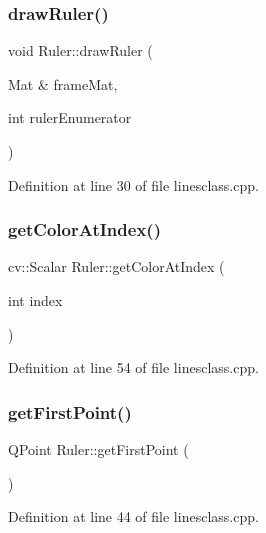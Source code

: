 \subsubsection{\texorpdfstring{drawRuler()}{drawRuler()}}
{\footnotesize\ttfamily void Ruler\+::draw\+Ruler (\begin{DoxyParamCaption}\item[{Mat \&}]{frame\+Mat,  }\item[{int}]{ruler\+Enumerator }\end{DoxyParamCaption})}



Definition at line 30 of file linesclass.\+cpp.

\mbox{\label{class_ruler_ae7e524a583b89c5905d1aee2d6ecb85d}} 
\subsubsection{\texorpdfstring{getColorAtIndex()}{getColorAtIndex()}}
{\footnotesize\ttfamily cv\+::\+Scalar Ruler\+::get\+Color\+At\+Index (\begin{DoxyParamCaption}\item[{int}]{index }\end{DoxyParamCaption})}



Definition at line 54 of file linesclass.\+cpp.

\mbox{\label{class_ruler_acd500bb44e0a7f79e881ae15e0a6a03a}} 
\subsubsection{\texorpdfstring{getFirstPoint()}{getFirstPoint()}}
{\footnotesize\ttfamily Q\+Point Ruler\+::get\+First\+Point (\begin{DoxyParamCaption}{ }\end{DoxyParamCaption})}



Definition at line 44 of file linesclass.\+cpp.

\mbox{\label{class_ruler_a8a39371560dd77a617496fffddc47966}} 
